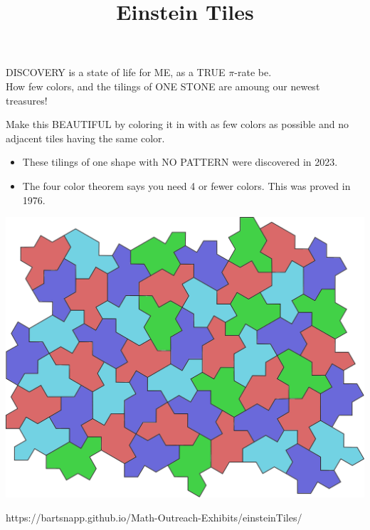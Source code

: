 \documentclass{../exhibit}
\title{Einstein Tiles}
\begin{document}
\begin{context}

  DISCOVERY is a state of life for ME,
   as a TRUE $\pi$-rate be.\\

   How few colors, and the tilings of ONE STONE are amoung our newest
   treasures!
  
\end{context}

\begin{directions}
  Make this BEAUTIFUL by coloring it in with as few colors as possible
  and no adjacent tiles having the same color.
  \begin{itemize}
  \item These tilings of one shape with NO PATTERN were discovered in 2023.
  \item The four color theorem says you need 4 or fewer colors. This
    was proved in 1976.
  \end{itemize}
\end{directions}

  \begin{example}
    \begin{center}
      \includegraphics[height=.3\textheight]{spectre.png}
    \end{center}
\end{example}

\begin{mathConnections}
  https://bartsnapp.github.io/Math-Outreach-Exhibits/einsteinTiles/
\end{mathConnections}
\end{document}

